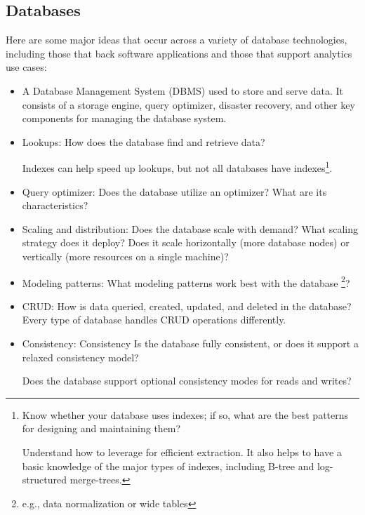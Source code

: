 \subsection*{Databases}
Here  are some major ideas that occur across a variety of
database technologies, including those that back software
applications and those that support analytics use cases:
\begin{itemize}
    \item A Database Management System (DBMS) used to
    store and serve data. It consists of a storage engine,
    query optimizer, disaster recovery, and other key
    components for managing the database system.

    \item Lookups: How does the database find and
    retrieve data?
    
    Indexes can help speed up lookups, but not all
    databases have indexes\footnote{
        Know whether your database uses indexes;
        if so, what are the best patterns for
        designing and maintaining them?

        Understand how to leverage for efficient
        extraction. It also helps to have a basic
        knowledge of the major types of indexes,
        including B-tree and log-structured
        merge-trees.
    }.

    \item Query optimizer: Does the database
    utilize an optimizer? What are its
    characteristics?

    \item Scaling and distribution: Does the
    database scale with demand? What scaling
    strategy does it deploy? Does it scale
    horizontally (more database nodes) or
    vertically (more resources on a
    single machine)?

    \item Modeling patterns: What modeling patterns
    work best with the database
    \footnote{
        e.g., data normalization or wide tables
    }?

    \item CRUD: How is data queried, created, updated,
    and deleted in the database? Every type of
    database handles CRUD operations differently.

    \item Consistency: Consistency
    Is the database fully consistent, or does it
    support a relaxed consistency model?

    Does the database support optional consistency
    modes for reads and writes?
\end{itemize}


